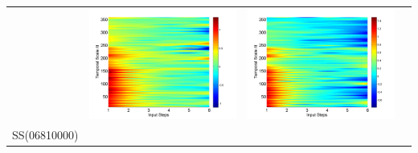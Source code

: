 \documentclass[draft,wrr]{AGUTeX}
\begin{document}
\begin{article}
\begin{table}[H]
\begin{tabular}{cccc}
&\begin{minipage}{.3\textwidth}\includegraphics[width=\linewidth]{resultgraph/11532500epdiff_former.png}\end{minipage}
&\begin{minipage}{.3\textwidth}\includegraphics[width=\linewidth]{resultgraph/11532500qdiff_former.png}\end{minipage}
\\
SS(06810000)

\end{tabular}
\end{table}
\end{article}
\end{document}
